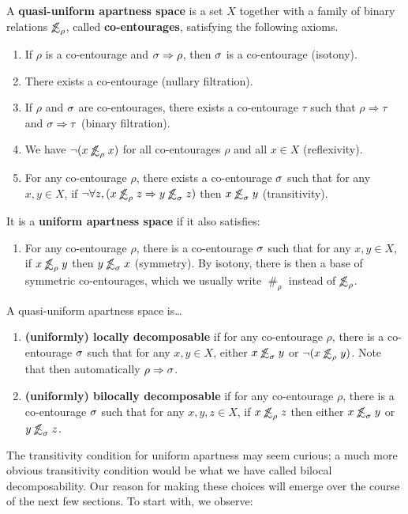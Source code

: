 \documentclass{article}
\def\apart{\mathrel{\#}}
\def\oapt{\mathrel{\!\not\,\not\lesssim}}
\let\implies\Rightarrow
\begin{document}
\begin{defn}
  A \textbf{quasi-uniform apartness space} is a set $X$ together with a family of binary relations $\oapt_\rho$, called \textbf{co-entourages}, satisfying the following axioms.
  \begin{enumerate}
  \item If $\rho$ is a co-entourage and $\si\implies\rho$, then $\sigma$ is a co-entourage (isotony).
  \item There exists a co-entourage (nullary filtration).
  \item If $\rho$ and $\sigma$ are co-entourages, there exists a co-entourage $\tau$ such that $\rho\implies\tau$ and $\si\implies\tau$ (binary filtration).
  \item We have $\neg(x\oapt_\rho x)$ for all co-entourages $\rho$ and all $x\in X$ (reflexivity).
  \item For any co-entourage $\rho$, there exists a co-entourage $\sigma$ such that for any $x,y\in X$, if $\neg\forall z,(x\oapt_\rho z \implies y\oapt_\si z)$ then $x\oapt_\si y$ (transitivity).
  \end{enumerate}
  It is a \textbf{uniform apartness space} if it also satisfies:
  \begin{enumerate}[resume]
  \item For any co-entourage $\rho$, there is a co-entourage $\sigma$ such that for any $x,y\in X$, if $x\oapt_\rho y$ then $y\oapt_\si x$ (symmetry).
    By isotony, there is then a base of symmetric co-entourages, which we usually write $\apart_\rho$ instead of $\oapt_\rho$.
  \end{enumerate}
  A quasi-uniform apartness space is\dots
  \begin{enumerate}[resume]
  \item \textbf{(uniformly) locally decomposable} if for any co-entourage $\rho$, there is a co-entourage $\sigma$ such that for any $x,y\in X$, either $x\oapt_\si y$ or $\neg(x\oapt_\rho y)$.
    Note that then automatically $\rho\implies\si$.
  \item \textbf{(uniformly) bilocally decomposable} if for any co-entourage $\rho$, there is a co-entourage $\sigma$ such that for any $x,y,z\in X$, if $x\oapt_\rho z$ then either $x\oapt_\si y$ or $y\oapt_\si z$.
  \end{enumerate}
\end{defn}

The transitivity condition for uniform apartness may seem curious; a much more obvious transitivity condition would be what we have called bilocal decomposability.
Our reason for making these choices will emerge over the course of the next few sections.
To start with, we observe:
\end{document}

